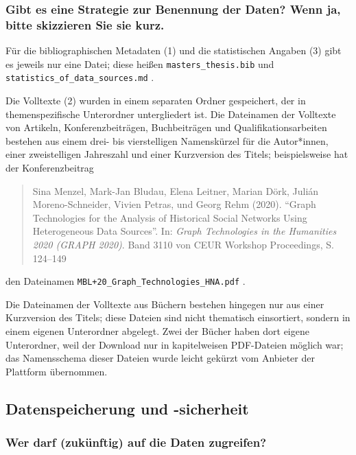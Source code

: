 \documentclass[%
  11pt,
  DIV=16,
  a4paper,
  BCOR=15mm,
  twoside=on,
  bibliography=totoc,
  headings=normal,
  numbers=noendperiod,
]{scrartcl}
\begin{document}
\subsubsection{Gibt es eine Strategie zur Benennung der Daten? Wenn ja, bitte skizzieren Sie sie kurz.}

Für die bibliographischen Metadaten (1) und die statistischen Angaben (3) gibt es jeweils nur eine Datei;
diese heißen \verb!masters_thesis.bib! und \verb!statistics_of_data_sources.md! .

Die Volltexte (2) wurden in einem separaten Ordner gespeichert, der in themenspezifische Unterordner
untergliedert ist. Die Dateinamen der Volltexte von Artikeln, Konferenzbeiträgen, Buchbeiträgen und Qualifikationsarbeiten
bestehen aus einem drei- bis vierstelligen Namenskürzel für die Autor*innen,
einer zweistelligen Jahreszahl und einer Kurzversion des Titels;
beispielsweise hat der Konferenzbeitrag
%
\begin{quote}
  {\textup
    Sina Menzel, Mark-Jan Bludau, Elena Leitner, Marian Dörk, Julián Moreno-Schneider, 
    Vivien Petras, und Georg Rehm (2020).
    \enquote{Graph Technologies for the Analysis of Historical Social Networks Using Heterogeneous Data Sources}.
    In: \emph{Graph Technologies in the Humanities 2020 (GRAPH 2020)}. Band 3110 von CEUR Workshop Proceedings, S.\,124–149%
  }
\end{quote}
%
den Dateinamen \verb!MBL+20_Graph_Technologies_HNA.pdf! .

Die Dateinamen der Volltexte aus Büchern bestehen hingegen nur aus einer Kurzversion des Titels;
diese Dateien sind nicht thematisch einsortiert, sondern in einem eigenen Unterordner abgelegt.
Zwei der Bücher haben dort eigene Unterordner, weil der Download nur in kapitelweisen PDF-Dateien
möglich war; das Namensschema dieser Dateien wurde leicht gekürzt vom Anbieter der Plattform übernommen.

\subsection{Datenspeicherung und -sicherheit}

\subsubsection{Wer darf (zukünftig) auf die Daten zugreifen?}
\end{document}
